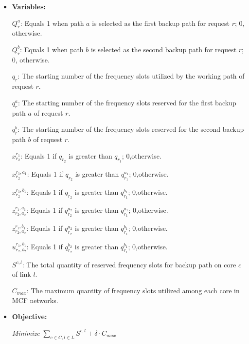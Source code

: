 \documentclass[a4paper,11pt]{report}
\begin{document}
\begin{itemize}
    \item \textbf{Variables:}
        \item[$Q^{a}_r$:]Equals 1 when path $a$ is selected as the first backup path for request $r$; 0, otherwise.
         \item[$Q^{b}_r$:]Equals 1 when path $b$ is selected as the second backup path for request $r$; 0, otherwise.
        \item[$q^{}_{r}$:]The starting number of the frequency slots utilized by the working path of request $r$.
         \item[$q^{a}_{r}$:]The starting number of the frequency slots reserved for the first backup path $a$ of request $r$.
         \item[$q^{b}_{r}$:]The starting number of the frequency slots reserved for the second backup path $b$ of request $r$.
          \item[$x^{r_1}_{r_2}$:]Equals 1 if $q^{}_{r_2}$ is greater than $q^{}_{r_1}$; 0,otherwise.
           \item[$x^{r_1,a_1}_{r_2}$:]Equals 1 if $q^{}_{r_2}$ is greater than $q^{a_1}_{r_1}$; 0,otherwise.
           
           \item[$x^{r_1,b_1}_{r_2}$:]Equals 1 if $q^{}_{r_2}$ is greater than $q^{b_1}_{r_1}$; 0,otherwise.
           
           \item[$z^{r_1,a^{}_1}_{r_2,a^{}_2}$:]Equals 1 if $q^{a_2}_{r_2}$ is greater than $q^{a_1}_{r_1}$; 0,otherwise.
           
           \item[$z^{r_1,b^{}_1}_{r_2,a^{}_2}$:]Equals 1 if $q^{a_2}_{r_2}$ is greater than $q^{b_1}_{r_1}$; 0,otherwise.
           
           \item[$u^{r_1,b^{}_1}_{r_2,b^{}_2}$:]Equals 1 if $q^{b_2}_{r_2}$ is greater than $q^{b_1}_{r_1}$; 0,otherwise.
           
           \item[$S^{c,l}$:]The total quantity of reserved frequency slots for backup path on core $c$ of link $l$.
           
           \item[$C^{}_{max}$:]The maximum quantity of frequency slots utilized among each core in MCF networks. 
\end{itemize}

\begin{itemize}
    \item \textbf{Objective:}
    \begin{center}
        {\mbox{\it Minimize}} $\sum\limits_{c\in C,l\in L} S^{c,l}+\delta \cdot C^{}_{max}$
    \end{center} 
\end{itemize}
\end{document}
